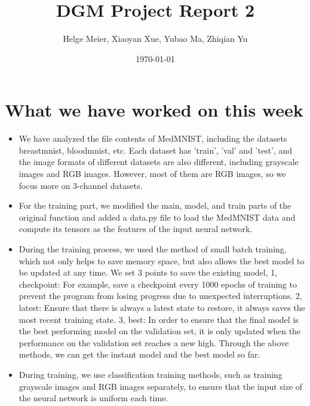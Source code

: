 \documentclass[
	ngerman,
	accentcolor=9c,%
	type=intern,
	marginpar=false
	]{tudapub}
\begin{document}
\title{DGM Project Report 2}
\author{Helge Meier, Xiaoyan Xue,  Yubao Ma, Zhiqian Yu}
\date{\today}

\maketitle

\section{What we have worked on this week}
\begin{itemize}
    \item We have analyzed the file contents of MedMNIST, including the datasets breastmnist, bloodmnist, etc. Each dataset has 'train', 'val' and 'test', and the image formats of different datasets are also different, including grayscale images and RGB images. However, most of them are RGB images, so we focus more on 3-channel datasets.
    \item For the training part, we modified the main, model, and train parts of the original function and added a data.py file to load the MedMNIST data and compute its tensors as the features of the input neural network.
    \item  During the training process, we used the method of small batch training, which not only helps to save memory space, but also allows the best model to be updated at any time. We set 3 points to save the existing model,
    1, checkpoint: For example, save a checkpoint every 1000 epochs of training to prevent the program from losing progress due to unexpected interruptions.
    2, latest: Ensure that there is always a latest state to restore, it always saves the most recent training state.
    3, best: In order to ensure that the final model is the best performing model on the validation set, it is only updated when the performance on the validation set reaches a new high.
    Through the above methods, we can get the instant model and the best model so far.
    \item During training, we use classification training methods, such as training grayscale images and RGB images separately, to ensure that the input size of the neural network is uniform each time.
\end{itemize}
\end{document}
